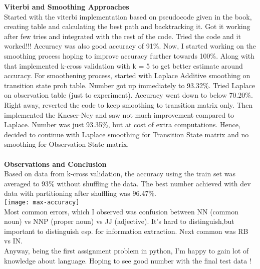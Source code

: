 \documentclass[addpoints,12pt]{exam}
\begin{document}
\textbf{Viterbi and Smoothing Approaches}\\
Started with the viterbi implementation based on pseudocode given in the book, creating table and calculating the best path and backtracking it. Got it working after few tries and integrated with the rest of the code. Tried the code and it worked!!! Accuracy was also good accuracy of 91\%. Now, I started working on the smoothing process hoping to improve accuracy further towards 100\%. Along with that implemented k-cross validation with k = 5 to get better estimate around accuracy. For smoothening process, started with Laplace Additive smoothing on transition state prob table. Number got up immediately to 93.32\%. Tried Laplace on observation table (just to experiment). Accuracy went down to below 70.20\%. Right away, reverted the code to keep smoothing to transition matrix only. Then implemented the Kneser-Ney and saw not much improvement compared to Laplace. Number was just 93.35\%, but at cost of extra computations. Hence, decided to continue with Laplace smoothing for Transition State matrix and no smoothing for Observation State matrix.\\ \\
\textbf{Observations and Conclusion}\\
Based on data from k-cross validation, the accuracy using the train set was averaged to 93\% without shuffling the data. The best number achieved with dev data with partitioning after shuffling was 96.47\%.\\
\texttt{[image: max-accuracy]}
\\
Most common errors, which I observed was confusion between NN (common noun) vs NNP  (proper noun) vs JJ (adjective). It's hard to distinguish,but important to distinguish esp. for information extraction. Next common was RB vs IN.\\Anyway, being the first assignment problem in python, I'm happy to gain lot of knowledge about language. Hoping to see good number with the final test data !
\end{document}
